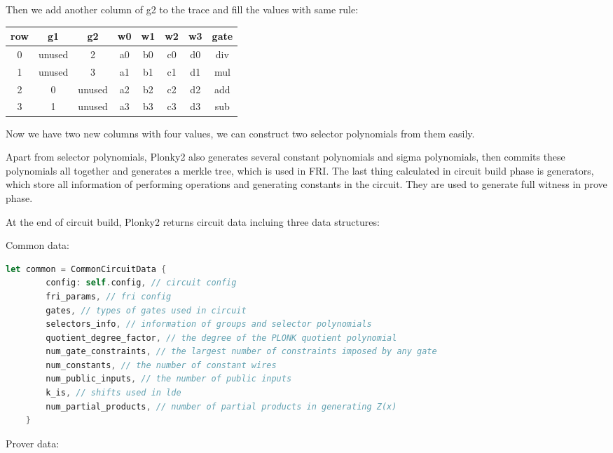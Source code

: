 Then we add another column of g2 to the trace and fill the values with same rule:

\begin{center}
    \begin{tabular}{ |c|c|c|c|c|c|c|c| }
        \hline
        row & g1 & g2 & w0 & w1 & w2 & w3 & gate \\
        \hline
        0 & unused & 2 & a0 & b0 & c0 & d0 & div \\
        \hline
        1 & unused & 3 & a1 & b1 & c1 & d1 & mul \\
        \hline
        2 & 0 & unused & a2 & b2 & c2 & d2 & add \\
        \hline
        3 & 1 & unused & a3 & b3 & c3 & d3 & sub \\
        \hline
    \end{tabular}
\end{center}

Now we have two new columns with four values, we can construct two selector polynomials from 
them easily.

Apart from selector polynomials, Plonky2 also generates several constant polynomials and sigma
polynomials, then commits these polynomials all together and generates a merkle tree, which is 
used in FRI. The last thing calculated in circuit build phase is generators, which store all 
information of performing operations and generating constants in the circuit. They are used to
generate full witness in prove phase.

At the end of circuit build, Plonky2 returns circuit data incluing three data structures:

Common data:

\begin{lstlisting}[language=rust]
    let common = CommonCircuitData {
        config: self.config, // circuit config
        fri_params, // fri config
        gates, // types of gates used in circuit
        selectors_info, // information of groups and selector polynomials
        quotient_degree_factor, // the degree of the PLONK quotient polynomial
        num_gate_constraints, // the largest number of constraints imposed by any gate
        num_constants, // the number of constant wires
        num_public_inputs, // the number of public inputs
        k_is, // shifts used in lde
        num_partial_products, // number of partial products in generating Z(x)
    }
\end{lstlisting}

Prover data:


